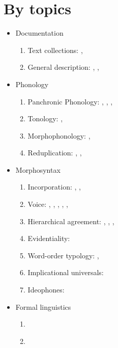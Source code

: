 \documentclass[oldfontcommands,oneside,a4paper,11pt]{article}
\begin{document}
\section{By topics}
\begin{itemize}

\item Documentation
\begin{enumerate}
\item  Text collections: \citet{jacques10gesar}, 
\item General description: \citet{jacques04these}, \citet{jacques08},
\end{enumerate}


\item Phonology
\begin{enumerate}
\item  Panchronic Phonology:  \citet{jacques11lingua}, \citet{michaud-jacques12nasalite},     \citet{jacques13arapaho}, 
\item   Tonology: \citet{jacques11pumi.tone},
\item Morphophonology: \citet{jacques12khaling},   
\item Reduplication:  \citet{jacques04redupl},  \citet{jacques07redupl},
\end{enumerate}

\item Morphosyntax
\begin{enumerate}
\item  Incorporation: \citet{jacques11tangut.verb}, \citet{jacques12incorp}, 
\item  Voice:  \citet{jacques07passif}, \citet{jacques10refl}, \citet{jacques12demotion}, \citet{jacques13derivational.khaling}, \citet{jacques13tropative}, \citet{jacques14antipassive}
\item Hierarchical agreement:  \citet{jacques10inverse},     \citet{jacques12khaling},   \citet{antonov14rtau}, \citet{jacques14inverse}
\item Evidentiality: \citet{jacques14auditory}
\item Word-order typology: \citet{jacques13harmonization}, 
\item Implicational universals: \citet{antonov14need}
\item Ideophones: \citet{japhug14ideophones}
\end{enumerate}

\item Formal linguistics
\begin{enumerate}
\item \citet{walther14inv.canon}
\item \citet{walther14compactness}
\end{enumerate}


\end{itemize}
\end{document}
